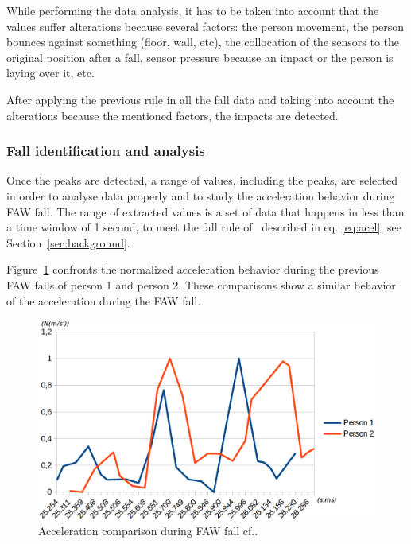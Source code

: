 \documentclass[10pt,journal,compsoc]{IEEEtran}
\begin{document}
While performing the data analysis, it has to be taken into account that the values suffer 
alterations because several factors: the person movement, the person bounces against something 
(floor, wall, etc), the collocation of the sensors to the original position after a fall, 
sensor pressure because an impact or the person is laying over it, etc.

After applying the previous rule in all the fall data and taking into account the alterations 
because the mentioned factors, the impacts are detected.

\subsubsection{Fall identification and analysis} Once the peaks are detected, a range of values, 
including the peaks, are selected in order to analyse data properly and to study the acceleration 
behavior during FAW fall. The range of extracted values is a set of data that happens in less 
than a time window of 1 second, to meet the fall rule of~\cite{Luder2009} described in eq. \ref{eq:acel}, see Section~\ref{sec:background}. 

%		

Figure~\ref{fig:FAWcomparison} confronts the normalized acceleration behavior during the previous FAW falls of person 1 and person 2. These comparisons show a similar behavior of the acceleration during the FAW fall.
\begin{figure}[!ht]
	\centering
	\includegraphics[scale=0.21]{Images/TwoFallsComparative.eps}
	\caption[Acceleration during FAW fall]{Acceleration comparison during FAW fall cf.\cite{LorenaFall}.}
	\label{fig:FAWcomparison}
\end{figure}
\end{document}
